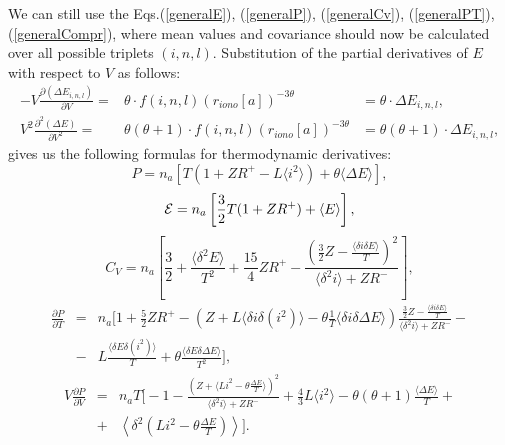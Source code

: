 We can still use the
Eqs.(\ref{generalE}), (\ref{generalP}), (\ref{generalCv}),
(\ref{generalPT}), (\ref{generalCompr}), where mean values and
covariance should now be calculated over all possible triplets $(i, n, l)$.
Substitution of the partial derivatives of $E$ with respect to $V$ as follows:
\begin{eqnarray}
-V \frac{\partial (\Delta E_{i,n,l})}{\partial V} =&
\theta \cdot f(i,n,l) (r_{iono}[a])^{-3 \theta} &=
\theta \cdot \Delta E_{i,n,l}, \\
V^2 \frac{\partial^2 (\Delta E)}{\partial V^2} =&
\theta (\theta + 1) \cdot f(i,n,l) (r_{iono}[a])^{-3 \theta} &=
\theta (\theta + 1) \cdot \Delta E_{i,n,l},
\end{eqnarray}
gives us the following formulas for thermodynamic derivatives:
\begin{equation}
P = n_a \left[ T(1 + ZR^+ - L \langle i^2 \rangle) +
\theta \langle \Delta E \rangle \right],
\end{equation}
\begin{equation}
{\cal E} = n_a \left[ \frac32 T (1 + ZR^+) + \langle E \rangle \right],
\end{equation}
\begin{equation}
C_V = n_a \left[ \frac32 + \frac{\langle \delta^2 E \rangle}{T^2} +
\frac{15}{4} ZR^+ - \frac{(\frac32 Z - \frac{\langle \delta i \delta E \rangle}{T})^2}
{\langle \delta^2 i \rangle + ZR^-} \right],
\end{equation}
\begin{eqnarray}
\nonumber \frac{\partial P}{\partial T} &=& n_a \Biggl[ 1 + \frac52 ZR^+ -
 \left( Z + L \langle \delta i \delta (i^2) \rangle
- \theta \frac{1}{T} \langle \delta i \delta \Delta E \rangle \right)
\frac{\frac32 Z - \frac{\langle \delta i \delta E \rangle}{T}}
{\langle \delta^2 i \rangle + ZR^-} - \\
&-& L \frac{\langle \delta E \delta (i^2) \rangle}{T} +
\theta \frac{\langle \delta E \delta \Delta E \rangle}{T^2} \Biggr],
\end{eqnarray}
\begin{eqnarray}
\nonumber V \frac{\partial P}{\partial V} &=& n_a T \Biggl[ -1 -
\frac{(Z + \langle Li^2 - \theta \frac{\Delta E}{T} \rangle)^2}
{\langle \delta^2 i \rangle + ZR^-} +
\frac43 L \langle i^2 \rangle -
\theta (\theta+1) \frac{\langle \Delta E \rangle}{T} + \\
&+& \left\langle \delta^2 \left( Li^2 - \theta \frac{\Delta E}{T} \right) \right\rangle \Biggr].
\end{eqnarray}

